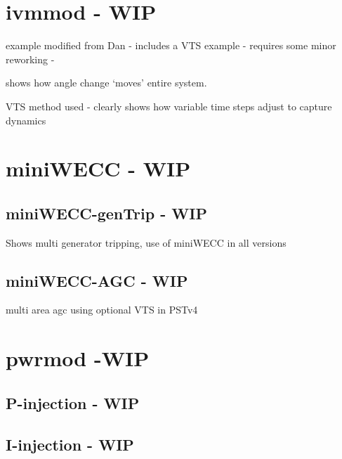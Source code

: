 





\pagebreak
\section{ivmmod - WIP} \label{sec: ivmmod ex}
example modified from Dan - includes a VTS example  -
requires some minor reworking - 

shows how angle change `moves' entire system.

VTS method used - clearly shows how variable time steps adjust to capture dynamics


\pagebreak
\section{miniWECC - WIP}

\subsection{miniWECC-genTrip - WIP} 
Shows multi generator tripping, use of miniWECC in all versions

\subsection{miniWECC-AGC - WIP} 
multi area agc using optional VTS in PSTv4




\pagebreak
\section{pwrmod -WIP} \label{sec: pwrmodExamples}
\subsection{P-injection - WIP}
\subsection{I-injection - WIP}

